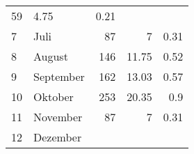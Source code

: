 \begin{longtable}{lXrrr}
       \num{59} &
       \num[round-mode=places,round-precision=2]{4.75} &
         \num[round-mode=places,round-precision=2]{0.21} \\

     7 &
     \multicolumn{1}{X}{ Juli   } &


       \num{87} &
       \num[round-mode=places,round-precision=2]{7} &
         \num[round-mode=places,round-precision=2]{0.31} \\

     8 &
     \multicolumn{1}{X}{ August   } &


       \num{146} &
       \num[round-mode=places,round-precision=2]{11.75} &
         \num[round-mode=places,round-precision=2]{0.52} \\

     9 &
     \multicolumn{1}{X}{ September   } &


       \num{162} &
       \num[round-mode=places,round-precision=2]{13.03} &
         \num[round-mode=places,round-precision=2]{0.57} \\

     10 &
     \multicolumn{1}{X}{ Oktober   } &


       \num{253} &
       \num[round-mode=places,round-precision=2]{20.35} &
         \num[round-mode=places,round-precision=2]{0.9} \\

     11 &
     \multicolumn{1}{X}{ November   } &


       \num{87} &
       \num[round-mode=places,round-precision=2]{7} &
         \num[round-mode=places,round-precision=2]{0.31} \\

     12 &
     \multicolumn{1}{X}{ Dezember   } &



\end{longtable}
